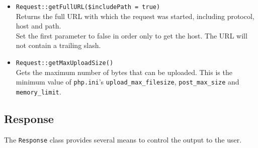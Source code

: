 \documentclass{scrartcl}
\begin{document}
\begin{itemize}
         \item \lstinline!Request::getFullURL($includePath = true)! \\
            Returns the full URL with which the request was started, including protocol, host and path. \\
            Set the first parameter to false in order only to get the host. The URL will not contain a trailing slash.
         \item \lstinline!Request::getMaxUploadSize()! \\
            Gets the maximum number of bytes that can be uploaded. This is the minimum value of \texttt{php.ini}'s \texttt{upload\_max\_filesize}, \texttt{post\_max\_size} and \texttt{memory\_limit}.
      \end{itemize}
   \subsection{Response}
      The \lstinline!Response! class provides several means to control the output to the user.
\end{document}
